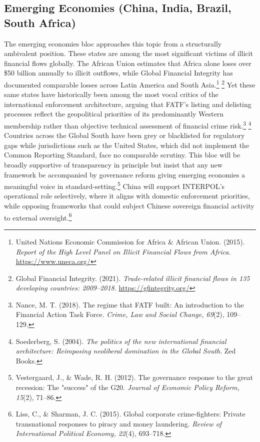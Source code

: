 \subsection{Emerging Economies (China, India, Brazil, South Africa)}

The emerging economies bloc approaches this topic from a structurally ambivalent position. These states are among the most significant victims of illicit financial flows globally. The African Union estimates that Africa alone loses over \$50 billion annually to illicit outflows, while Global Financial Integrity has documented comparable losses across Latin America and South Asia.\footnote{United Nations Economic Commission for Africa \& African Union. (2015). \emph{Report of the High Level Panel on Illicit Financial Flows from Africa}. \url{https://www.uneca.org/}} \footnote{Global Financial Integrity. (2021). \emph{Trade-related illicit financial flows in 135 developing countries: 2009–2018}. \url{https://gfintegrity.org/}} Yet these same states have historically been among the most vocal critics of the international enforcement architecture, arguing that FATF's listing and delisting processes reflect the geopolitical priorities of its predominantly Western membership rather than objective technical assessment of financial crime risk.\footnote{Nance, M. T. (2018). The regime that FATF built: An introduction to the Financial Action Task Force. \emph{Crime, Law and Social Change, 69}(2), 109–129.} \footnote{Soederberg, S. (2004). \emph{The politics of the new international financial architecture: Reimposing neoliberal domination in the Global South}. Zed Books.} Countries across the Global South have been grey or blacklisted for regulatory gaps while jurisdictions such as the United States, which did not implement the Common Reporting Standard, face no comparable scrutiny. This bloc will be broadly supportive of transparency in principle but insist that any new framework be accompanied by governance reform giving emerging economies a meaningful voice in standard-setting.\footnote{Vestergaard, J., \& Wade, R. H. (2012). The governance response to the great recession: The "success" of the G20. \emph{Journal of Economic Policy Reform, 15}(2), 71–86.} China will support INTERPOL's operational role selectively, where it aligns with domestic enforcement priorities, while opposing frameworks that could subject Chinese sovereign financial activity to external oversight.\footnote{Liss, C., \& Sharman, J. C. (2015). Global corporate crime-fighters: Private transnational responses to piracy and money laundering. \emph{Review of International Political Economy, 22}(4), 693–718.}

